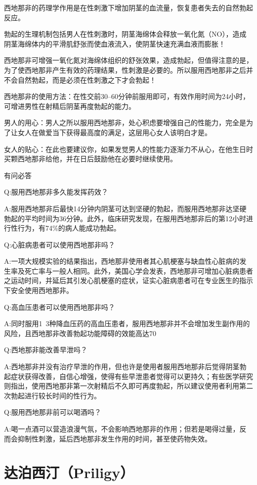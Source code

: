 \documentclass[12pt,UTF8]{ctexbook}
\begin{document}
西地那非的药理学作用是在性刺激下增加阴茎的血流量，恢复患者失去的自然勃起反应。

勃起的生理机制包括男人在性刺激时，阴茎海绵体会释放一氧化氮（NO），造成阴茎海绵体内的平滑肌舒张而使血液流入，使阴茎快速充满血液而膨胀！

西地那非可增强一氧化氮对海绵体组织的舒张效果，造成勃起，但值得注意的是，为了使西地那非产生有效的药理结果，性刺激是必要的。所以服用西地那非之后并不会自然勃起，而是必须在性刺激之下才会勃起！

西地那非的使用方法：在性交前30--60分钟前服用即可，有效作用时间为24小时，可增进男性在射精后阴茎再度勃起的能力。

男人的用心：男人之所以服用西地那非，处心积虑要增强自己的性能力，完全是为了让女人在做爱当下获得最高度的满足，这层用心女人该明白才是。

女人的贴心：在此也要建议你，如果发觉男人的性能力逐渐力不从心，在他生日时买颗西地那非给他，并在日后鼓励他在必要时继续使用。

有问必答

Q:服用西地那非多久能发挥药效？

A:服用西地那非后最快14分钟内阴茎可达到坚硬的勃起，而服用西地那非达坚硬勃起的平均时间为36分钟。此外，临床研究发现，在服用西地那非后的第12小时进行性行为，有74\%的病人能成功勃起。

Q:心脏病患者可以使用西地那非吗？

A:一项大规模实验的结果指出，西地那非使用者其心肌梗塞与缺血性心脏病的发生率及死亡率与一般人相同。此外，美国心学会发表，西地那非可增加心脏病患者之运动时间，并延后其引发心肌梗塞的症状，证实心脏病患者可在专业医生的指示下安全使用西地那非。

Q:高血压患者可以使用西地那非吗？

A:同时服用1~3种降血压药的高血压患者，服用西地那非并不会增加发生副作用的风险，且西地那非改善勃起功能障碍的效能高达70%

Q:西地那非能改善早泄吗？

A:西地那非并没有治疗早泄的作用，但也许是使用者服用西地那非后觉得阴茎勃起症状获得改善，自信心增强，使得有些早泄患者觉得可以更持久；有些医学研究则指出，使用西地那非第一次射精后不久即可再度勃起，所以建议使用者利用第二次勃起进行较长时间的性行为。

Q:服用西地那非前可以喝酒吗？

A:喝一点酒可以营造浪漫气氛，不会影响西地那非的作用；但若是喝得过量，反而会抑制性刺激，延后西地那非发生作用的时间，甚至使药物失效。

\section{达泊西汀（Priligy）}
\end{document}
